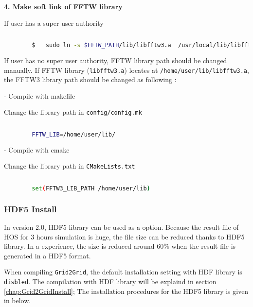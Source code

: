 		
		\vspace{0.5cm}
		\textbf{4. Make soft link of FFTW library }
		
		If user has a super user authority
		
		\begin{lstlisting}[language=bash]
		
		$	sudo ln -s $FFTW_PATH/lib/libfftw3.a  /usr/local/lib/libfftw3.a		
		\end{lstlisting}
				
		\vspace{0.5cm}
		
		If user has no super user authority, FFTW library path should be changed manually. If FFTW library (\texttt{libfftw3.a}) locates at \texttt{/home/user/lib/libfftw3.a}, the FFTW3 library path should be changed as following : 
		
		- Compile with makefile
		
		Change the library path in \texttt{config/config.mk}
		
		\begin{lstlisting}[language=bash]
		
		FFTW_LIB=/home/user/lib/
		\end{lstlisting}

		- Compile with cmake		
		
		Change the library path in \texttt{CMakeLists.txt}		

		\begin{lstlisting}[language=bash]
		
		set(FFTW3_LIB_PATH /home/user/lib)
		\end{lstlisting}		
		
		\subsubsection{HDF5 Install}
		
		\label{chap:HDF5Install}
		
		In version 2.0, HDF5 library can be used as a option. Because the result file of HOS for 3 hours simulation is huge, the file size can be reduced thanks to HDF5 library. In a experience, the size is reduced around 60\% when the result file is generated in a HDF5 format. 
				
		When compiling \texttt{Grid2Grid}, the default installation setting with HDF library is \texttt{disbled}. The compilation with HDF library will be explaind in section \ref{chap:Grid2GridInstall}; The installation procedures for the HDF5 library is given in below. 		
				
